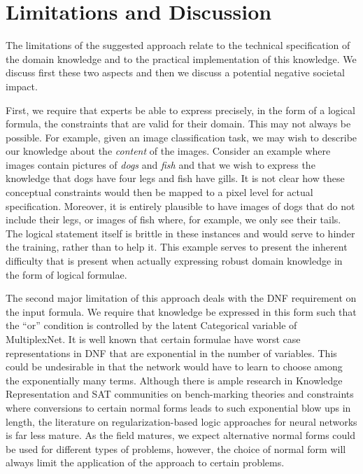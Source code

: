 \documentclass[letterpaper]{article} %
\begin{document}

\section{Limitations and Discussion}
\label{sec:limitations}
The limitations of the suggested approach relate to the technical specification of the domain knowledge and to the practical implementation of this knowledge.
We discuss first these two aspects and then we discuss a potential negative societal impact.

First, we require that experts be able to express precisely, in the form of a logical formula, the constraints that are valid for their domain.
This may not always be possible.
For example, given an image classification task, we may wish to describe our knowledge about the \textit{content} of the images.
Consider an example where images contain pictures of \textit{dogs} and \textit{fish} and that we wish to express the knowledge that dogs have four legs and fish have gills.
It is not clear how these conceptual constraints would then be mapped to a pixel level for actual specification.
Moreover, it is entirely plausible to have images of dogs that do not include their legs, or images of fish where, for example, we only see their tails.
The logical statement itself is brittle in these instances and would serve to hinder the training, rather than to help it.
This example serves to present the inherent difficulty that is present when actually expressing robust domain knowledge in the form of logical formulae.

The second major limitation of this approach deals with the DNF requirement on the input formula.
We require that knowledge be expressed in this form such that the ``or'' condition is controlled by the latent Categorical variable of MultiplexNet.
It is well known that certain formulae have worst case representations in DNF that are exponential in the number of variables.
This could be undesirable in that the network would have to learn to choose among the exponentially many terms.
Although there is ample research in Knowledge Representation and SAT communities on bench-marking theories and constraints where conversions to certain normal forms leads to such exponential blow ups in length, the literature on regularization-based logic approaches for neural networks is far less mature.
As the field matures, we expect alternative normal forms could be used for different types of problems, however, the choice of normal form will always limit the application of the approach to certain problems.
\end{document}
